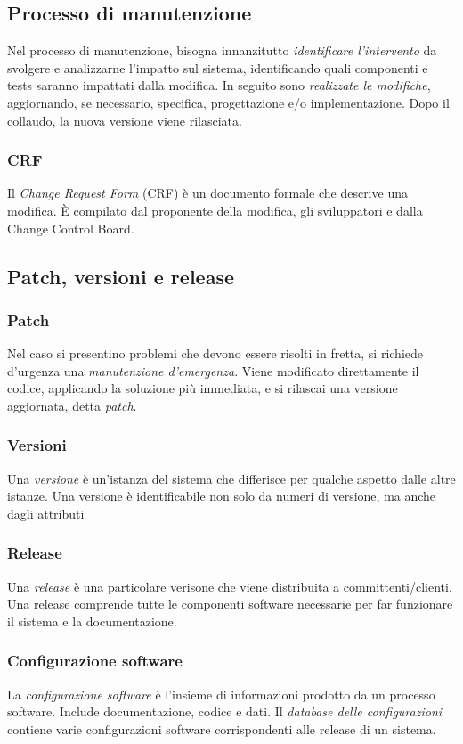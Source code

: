 \documentclass[11pt]{article}
\begin{document}
\subsection{Processo di manutenzione}
Nel processo di manutenzione, bisogna innanzitutto \textit{identificare l'intervento} da svolgere e analizzarne l'impatto 
sul sistema, identificando quali componenti e tests saranno impattati dalla modifica. 
In seguito sono \textit{realizzate le modifiche}, aggiornando, se necessario, specifica, progettazione e/o implementazione.
Dopo il collaudo, la nuova versione viene rilasciata.
\subsubsection*{CRF}
Il \textit{Change Request Form} (CRF) è un documento formale che descrive una modifica.
È compilato dal proponente della modifica, gli sviluppatori e dalla Change Control Board. 
\subsection{Patch, versioni e release}
\subsubsection*{Patch}
Nel caso si presentino problemi che devono essere risolti in fretta, si richiede d'urgenza una \textit{manutenzione d'emergenza}.
Viene modificato direttamente il codice, applicando la soluzione più immediata, e si rilascai una versione aggiornata, 
detta \textit{patch}.
\subsubsection*{Versioni}
Una \textit{versione} è un'istanza del sistema che differisce per qualche aspetto dalle altre istanze.  Una versione è 
identificabile non solo da numeri di versione, ma anche dagli attributi
\subsubsection*{Release}
Una \textit{release} è una particolare verisone che viene distribuita a committenti/clienti. Una release comprende tutte 
le componenti software necessarie per far funzionare il sistema e la documentazione.
\subsubsection*{Configurazione software}
La \textit{configurazione software} è l'insieme di informazioni prodotto da un processo software. Include documentazione, 
codice e dati. Il \textit{database delle configurazioni} contiene varie configurazioni software corrispondenti alle release 
di un sistema.
\end{document}
